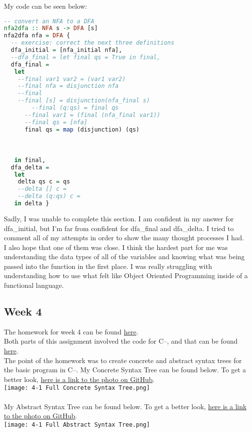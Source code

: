\documentclass{article}
\theoremstyle{theorem}
\theoremstyle{definition}
\theoremstyle{remark}
\begin{document}
My code can be seen below:

\begin{lstlisting}[language=Haskell]
-- convert an NFA to a DFA
nfa2dfa :: NFA s -> DFA [s]
nfa2dfa nfa = DFA {
  -- exercise: correct the next three definitions 
  dfa_initial = [nfa_initial nfa],
  --dfa_final = let final qs = True in final,
  dfa_final = 
   let 
    --final var1 var2 = (var1 var2)
    --final nfa = disjunction nfa
    --final 
    --final [s] = disjunction(nfa_final s)
        --final (q:qs) = final qs
      --final var1 = (final (nfa_final var1))
      --final qs = [nfa]
      final qs = map (disjunction) (qs)
      


   in final,
  dfa_delta = 
   let 
    delta qs c = qs 
    --delta [] c = 
    --delta (q:qs) c = 
   in delta }
\end{lstlisting}

Sadly, I was unable to complete this section. I am confident in my answer for dfa\_initial, but I'm far from confident for dfa\_final and dfa\_delta. 
I tried to comment all of my attempts in order to show the many thought processes I had. 
I also hope that one of them was close. I think the hardest part for me was understanding the data types of all of the variables and knowing what was being passed into the function in the first place. 
I was really struggling with understanding how to use what felt like Object Oriented Programming inside of a functional language. 

\subsection{Week 4}
The homework for week 4 can be found \href{https://hackmd.io/@alexhkurz/HJ4KjezfO}{here}.\\
Both parts of this assignment involved the code for C--, and that can be found \href{https://github.com/alexhkurz/compiler-construction-2022/blob/main/bnfc-tutorial-C--.md}{here}.\\

The point of the homework was to create concrete and abstract syntax trees for the basic program in C--. 
My Concrete Syntax Tree can be found below. To get a better look, \href{https://github.com/mamba72/CompilerConstruction_Assignments/blob/main/Reports/ReportResources/4-1\%20Full\%20Concrete\%20Syntax\%20Tree.png}{here is a link to the photo on GitHub}.\\
\texttt{[image: 4-1 Full Concrete Syntax Tree.png]}\\
\\
My Abstract Syntax Tree can be found below. To get a better look, \href{https://github.com/mamba72/CompilerConstruction_Assignments/blob/main/Reports/ReportResources/4-1\%20Full\%20Abstract\%20Syntax\%20Tree.png}{here is a link to the photo on GitHub}.\\
\texttt{[image: 4-1 Full Abstract Syntax Tree.png]}\\
\end{document}
